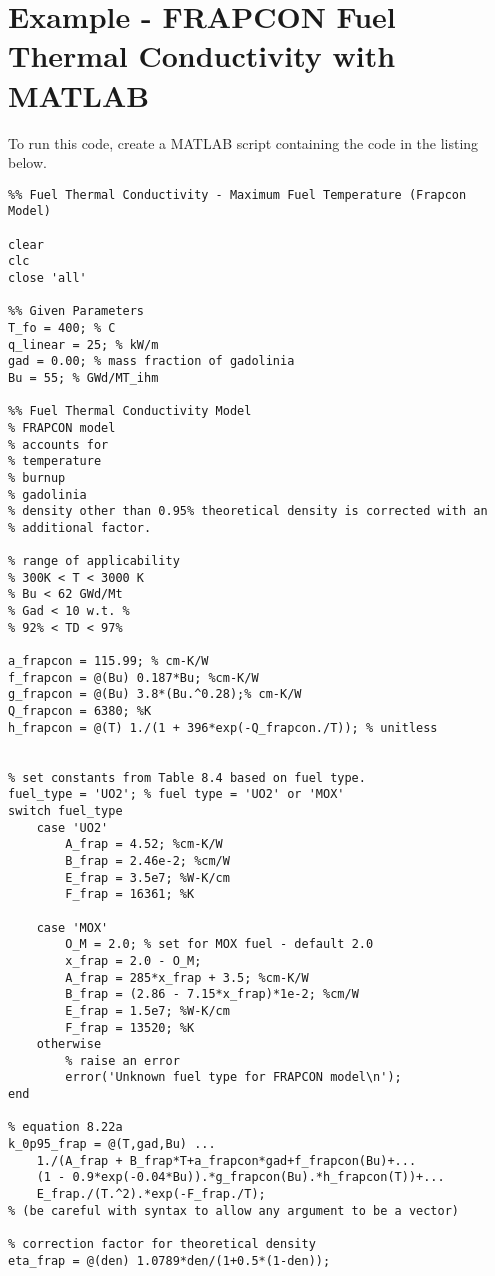 \chapter{Example - FRAPCON Fuel Thermal Conductivity with MATLAB}
\label{app:FRAP_ex}


To run this code, create a MATLAB script containing the code in the listing below.

\begin{fullwidth}
\begin{lstlisting}
%% Fuel Thermal Conductivity - Maximum Fuel Temperature (Frapcon Model)

clear
clc
close 'all'

%% Given Parameters
T_fo = 400; % C
q_linear = 25; % kW/m
gad = 0.00; % mass fraction of gadolinia
Bu = 55; % GWd/MT_ihm

%% Fuel Thermal Conductivity Model
% FRAPCON model
% accounts for 
% temperature
% burnup
% gadolinia
% density other than 0.95% theoretical density is corrected with an
% additional factor.

% range of applicability
% 300K < T < 3000 K
% Bu < 62 GWd/Mt
% Gad < 10 w.t. %
% 92% < TD < 97%

a_frapcon = 115.99; % cm-K/W
f_frapcon = @(Bu) 0.187*Bu; %cm-K/W
g_frapcon = @(Bu) 3.8*(Bu.^0.28);% cm-K/W
Q_frapcon = 6380; %K
h_frapcon = @(T) 1./(1 + 396*exp(-Q_frapcon./T)); % unitless


% set constants from Table 8.4 based on fuel type.
fuel_type = 'UO2'; % fuel type = 'UO2' or 'MOX'
switch fuel_type
    case 'UO2'
        A_frap = 4.52; %cm-K/W
        B_frap = 2.46e-2; %cm/W
        E_frap = 3.5e7; %W-K/cm
        F_frap = 16361; %K
       
    case 'MOX'
        O_M = 2.0; % set for MOX fuel - default 2.0
        x_frap = 2.0 - O_M;
        A_frap = 285*x_frap + 3.5; %cm-K/W
        B_frap = (2.86 - 7.15*x_frap)*1e-2; %cm/W
        E_frap = 1.5e7; %W-K/cm
        F_frap = 13520; %K
    otherwise
        % raise an error
        error('Unknown fuel type for FRAPCON model\n');
end

% equation 8.22a
k_0p95_frap = @(T,gad,Bu) ...
    1./(A_frap + B_frap*T+a_frapcon*gad+f_frapcon(Bu)+...
    (1 - 0.9*exp(-0.04*Bu)).*g_frapcon(Bu).*h_frapcon(T))+...
    E_frap./(T.^2).*exp(-F_frap./T);
% (be careful with syntax to allow any argument to be a vector)

% correction factor for theoretical density
eta_frap = @(den) 1.0789*den/(1+0.5*(1-den));


\end{lstlisting}
\end{fullwidth}
